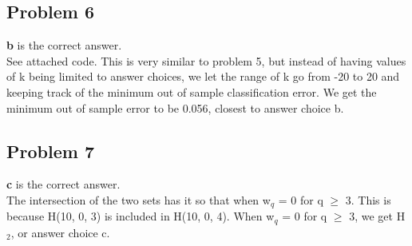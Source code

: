 \documentclass[12 pt]{article}
\begin{document}
	\subsection*{Problem 6}
	\textbf{b} is the correct answer. \\
	See attached code. This is very similar to problem 5, but instead of having values of k being limited to answer choices, we let the range of k go from -20 to 20 and keeping track of the minimum out of sample classification error. We get the minimum out of sample error to be 0.056, closest to answer choice b.

		
	\subsection*{Problem 7}
	\textbf{c} is the correct answer. \\
	The intersection of the two sets has it so that when w$_q$ = 0 for q $\geq$ 3. This is because H(10, 0, 3) is included in H(10, 0, 4). When w$_q$ = 0 for q $\geq$ 3, we get H$_2$, or answer choice c. 

		
	
\end{document}
